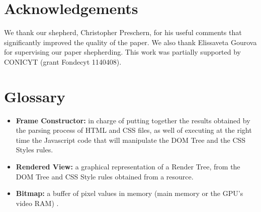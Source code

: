 \documentclass[prodmode,acmtecs]{acmsmall}
\begin{document}
\section{Acknowledgements}
We thank our shepherd, Christopher Preschern, for his useful comments that significantly improved the quality of the paper. We also thank Elissaveta Gourova for supervising our paper shepherding. 
This work was partially supported by CONICYT (grant Fondecyt 1140408).

\section{Glossary}
\begin{itemize}\leftskip0.2em
  \item \textbf{Frame Constructor:} in charge of putting together the results obtained by the parsing process of HTML and CSS files, as well of executing at the right time the Javascript code that will manipulate the DOM Tree and the CSS Styles rules. 
  \item \textbf{Rendered View:} a graphical representation of a Render Tree, from the DOM Tree and CSS Style rules obtained from a resource.
  \item \textbf{Bitmap:} a buffer of pixel values in memory (main memory or the GPU’s video RAM) \cite{gpuchrome}.
\end{itemize}


  

\end{document}
